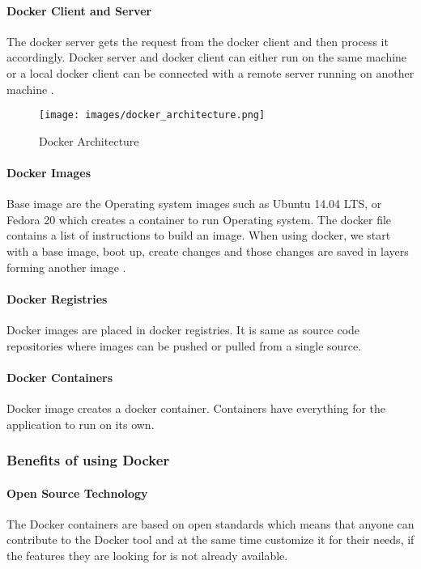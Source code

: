 \documentclass[sigconf]{acmart}
\begin{document}
	\paragraph{Docker Client and Server}
	The docker server gets the request from the docker client and then process it accordingly. Docker server and docker client can either run on the same machine or a local docker client can be connected with a remote server running on another machine \cite{turnbull2014docker}.
	
	\begin{figure}
		\centering
		\texttt{[image: images/docker\_architecture.png]}
		\caption{Docker Architecture \cite{turnbull2014docker}} \label{fig:figure1} 
	\end{figure}
    
	\paragraph{Docker Images}
	Base image are the Operating system images such as Ubuntu 14.04 LTS, or Fedora 20 which creates a container to run Operating system. The docker file contains a list of instructions to build an image. When using docker, we start with a base image, boot up, create changes and those changes are saved in layers forming another image \cite{rad2017introduction}.
	\paragraph{Docker Registries}
	Docker images are placed in docker registries. It is same as source code repositories where images can be pushed or pulled from a single source.
	\paragraph{Docker Containers}
	Docker image creates a docker container. Containers have everything for the application to run on its own.
	
	\subsubsection{Benefits of using Docker}
	\paragraph{Open Source Technology}
	The Docker containers are based on open standards which means that anyone can contribute to the Docker tool and at the same time customize it for their needs, if the features they are looking for is not already available.
\end{document}
